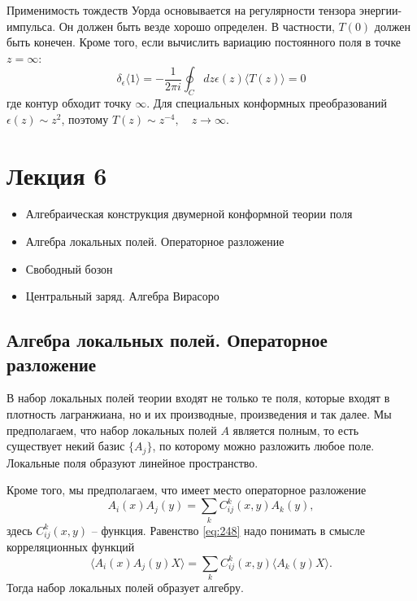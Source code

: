 \documentclass[a4paper,12pt]{article}
\theoremstyle{definition}
\theoremstyle{definition}
\theoremstyle{definition}
\begin{document}
Применимость тождеств Уорда основывается на регулярности тензора энергии-импульса. Он должен быть везде хорошо определен. В частности, $T(0)$ должен быть конечен. Кроме того, если вычислить вариацию постоянного поля в точке $z=\infty$:
\begin{equation}
  \label{eq:247}
  \delta_{\epsilon} \langle 1\rangle =-\frac{1}{2\pi i} \oint_{C}dz \epsilon(z) \langle T(z)\rangle =0
\end{equation}
где контур обходит точку $\infty$. Для специальных конформных преобразований $\epsilon(z)\sim z^{2}$, поэтому $T(z)\sim z^{-4},\quad z\to \infty$.

\section{Лекция 6}
\label{sec:-6}


  \begin{itemize}
  \item Алгебраическая конструкция двумерной конформной теории поля
  \item Алгебра локальных полей. Операторное разложение
  \item Свободный бозон
  \item Центральный заряд. Алгебра Вирасоро
  \end{itemize}


\subsection{Алгебра локальных полей. Операторное разложение}
\label{sec:ope}

В набор локальных полей теории входят не только те поля, которые входят в плотность лагранжиана, но и их производные, произведения и так далее.
Мы предполагаем, что набор локальных полей $A$ является полным, то есть существует некий базис $\{ A_{j}\}$, по которому можно разложить любое поле. Локальные поля образуют линейное пространство.

Кроме того, мы предполагаем, что имеет место операторное разложение
\begin{equation}
  \label{eq:248}
  A_{i}(x)A_{j}(y) =\sum_{k} C^{k}_{ij} (x,y) A_{k}(y),
\end{equation}
здесь $C_{ij}^{k}(x,y)$ -- функция. Равенство \eqref{eq:248} надо понимать в смысле корреляционных функций
\begin{equation}
  \label{eq:249}
  \langle A_{i}(x) A_{j}(y) X\rangle = \sum_{k} C^{k}_{ij} (x,y) \langle A_{k}(y) X\rangle.
\end{equation}
Тогда набор локальных полей образует алгебру. 
\end{document}
